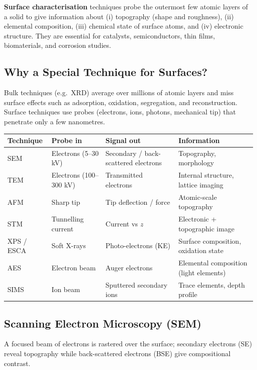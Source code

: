 \documentclass[12pt,a4paper]{article}
\begin{document}
\begin{tcolorbox}[defbox]
\textbf{Surface characterisation} techniques probe the outermost few atomic layers of a solid to give information about (i) topography (shape and roughness), (ii) elemental composition, (iii) chemical state of surface atoms, and (iv) electronic structure. They are essential for catalysts, semiconductors, thin films, biomaterials, and corrosion studies.
\end{tcolorbox}

\subsection{Why a Special Technique for Surfaces?}
Bulk techniques (e.g.\ XRD) average over millions of atomic layers and miss surface effects such as adsorption, oxidation, segregation, and reconstruction. Surface techniques use probes (electrons, ions, photons, mechanical tip) that penetrate only a few nanometres.

\begin{tabularx}{\linewidth}{|B{2.6cm}|Y|Y|Y|}
\hline
\textbf{Technique} & \textbf{Probe in} & \textbf{Signal out} & \textbf{Information} \\
\hline
SEM & Electrons (5--30 kV) & Secondary / back-scattered electrons & Topography, morphology \\
\hline
TEM & Electrons (100--300 kV) & Transmitted electrons & Internal structure, lattice imaging \\
\hline
AFM & Sharp tip & Tip deflection / force & Atomic-scale topography \\
\hline
STM & Tunnelling current & Current vs $z$ & Electronic + topographic image \\
\hline
XPS / ESCA & Soft X-rays & Photo-electrons (KE) & Surface composition, oxidation state \\
\hline
AES & Electron beam & Auger electrons & Elemental composition (light elements) \\
\hline
SIMS & Ion beam & Sputtered secondary ions & Trace elements, depth profile \\
\hline
\end{tabularx}

\subsection{Scanning Electron Microscopy (SEM)}
A focused beam of electrons is rastered over the surface; secondary electrons (SE) reveal topography while back-scattered electrons (BSE) give compositional contrast.
\end{document}
